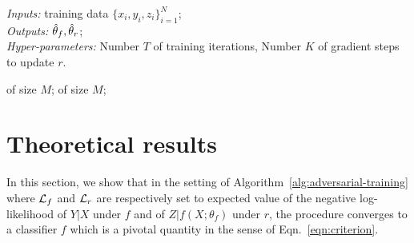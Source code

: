 \documentclass[twocolumn,superscriptaddress,aps]{revtex4-1}
\theoremstyle{plain}
\begin{document}
\begin{figure*}
    \begin{minipage}{\linewidth}
    \begin{algorithm}[H]
    \caption{Adversarial training of a classifier $f$ against an adversary $r$.}

    \begin{flushleft}
        {\it Inputs:} training data $\{ x_i, y_i, z_i \}_{i=1}^N$;\\
        {\it Outputs:} $\smash{\hat\theta_f}, \smash{\hat\theta_r}$;\\
        {\it Hyper-parameters:} Number $T$ of training iterations,
                                Number $K$ of gradient steps to update $r$.
    \end{flushleft}

    \label{alg:adversarial-training}
    \begin{algorithmic}[1]
             
                 of size $M$;
            \EndFor
             of size $M$; 
        \EndFor
    \end{algorithmic}
    \end{algorithm}
    \end{minipage}
\end{figure*}



\section{Theoretical results}
\label{sec:theory}

In this section, we show that in the setting of
Algorithm~\ref{alg:adversarial-training} where ${\cal L}_f$ and ${\cal L}_r$ are
respectively set to expected value of the negative log-likelihood of $Y|X$ under
$f$ and of $Z|f(X;\theta_f)$ under $r$, the procedure converges to a classifier
$f$ which is a pivotal quantity in the sense of Eqn.~\ref{eqn:criterion}.
\end{document}

